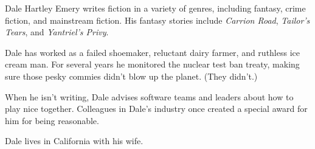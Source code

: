 
\bigskip
\noindent
Dale Hartley Emery
writes fiction in a variety of genres,
including fantasy, crime fiction, and mainstream fiction.
His fantasy stories include
\emph{Carrion Road},
\emph{Tailor's Tears},
and \emph{Yantriel's Privy}.

Dale has worked as a failed shoemaker,
reluctant dairy farmer,
and ruthless ice cream man.
For several years
he monitored the nuclear test ban treaty,
making sure those pesky commies didn't blow up the planet.
(They didn't.)

When he isn't writing,
Dale advises software teams and leaders
about how to play nice together.
Colleagues in Dale's industry
once created a special award for him
for being reasonable.

Dale lives in California with his wife.
